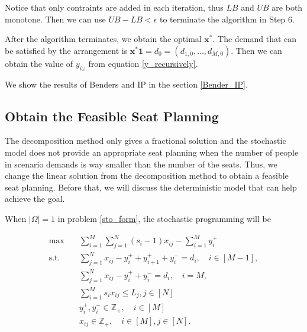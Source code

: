 \begin{remark}
  Notice that only contraints are added in each iteration, thus $LB$ and $UB$ are both monotone. Then we can use $UB - LB < \epsilon$ to terminate the algorithm in Step 6.
\end{remark}


After the algorithm terminates, we obtain the optimal $\mathbf{x}^{*}$. The demand that can be satisfied by the arrangement is $\mathbf{x}^{*} \mathbf{1} = d_0 = (d_{1,0},\ldots,d_{M,0})$.
Then we can obtain the value of $y_{i \omega}$ from equation \eqref{y_recursively}.

We show the results of Benders and IP in the section \ref{Bender_IP}.

\subsection{Obtain the Feasible Seat Planning}\label{seat_assignment}
The decomposition method only gives a fractional solution and the stochastic model does not provide an appropriate seat planning when the number of people in scenario demands is way smaller than the number of the seats. Thus, we change the linear solution from the decomposition method to obtain a feasible seat planning. Before that, we will discuss the deterministic model that can help achieve the goal. 


When $|\Omega| =1$ in problem \eqref{sto_form}, the stochastic programming will be 

\begin{equation}\label{one_form}
  \begin{aligned}
  \max \quad & \sum_{i=1}^{M}  \sum_{j= 1}^{N} (s_i-1) x_{ij} - \sum_{i=1}^{M} y_{i}^{+}  \\
  \text {s.t.} \quad & \sum_{j= 1}^{N} x_{ij} - y_{i}^{+}+ y_{i+1}^{+} + y_{i}^{-} = d_{i}, \quad i \in [M-1], \\
  & \sum_{j= 1}^{N} x_{ij} -y_{i}^{+} + y_{i}^{-} = d_{i}, \quad i = M, \\
  & \sum_{i=1}^{M} s_{i} x_{ij} \leq L_j, j \in [N]\\
  & y_{i}^{+}, y_{i}^{-} \in \mathbb{Z}_{+}, \quad i \in [M] \\
  & x_{ij} \in \mathbb{Z}_{+}, \quad i \in [M], j \in [N].
  \end{aligned}
\end{equation}

